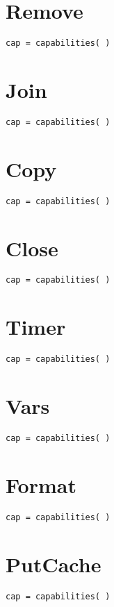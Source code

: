\section{Remove}
\begin{Verbatim}
cap = capabilities( )
\end{Verbatim}

\section{Join}
\begin{Verbatim}
cap = capabilities( )
\end{Verbatim}

\section{Copy}
\begin{Verbatim}
cap = capabilities( )
\end{Verbatim}

\section{Close}
\begin{Verbatim}
cap = capabilities( )
\end{Verbatim}

\section{Timer}
\begin{Verbatim}
cap = capabilities( )
\end{Verbatim}

\section{Vars}
\begin{Verbatim}
cap = capabilities( )
\end{Verbatim}

\section{Format}
\begin{Verbatim}
cap = capabilities( )
\end{Verbatim}

\section{PutCache}
\begin{Verbatim}
cap = capabilities( )
\end{Verbatim}

